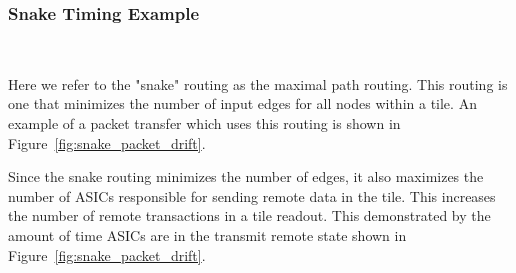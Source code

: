 \subsubsection{Snake Timing Example}~\label{sec:snake_timing}

Here we refer to the "snake" routing as the maximal path routing.
This routing is one that minimizes the number of input edges for all nodes within a tile.
An example of a packet transfer which uses this routing is shown in Figure~\ref{fig:snake_packet_drift}.

Since the snake routing minimizes the number of edges, it also maximizes the number of ASICs responsible for sending remote data in the tile.
This increases the number of remote transactions in a tile readout.
This demonstrated by the amount of time ASICs are in the transmit remote state shown in Figure~\ref{fig:snake_packet_drift}.

